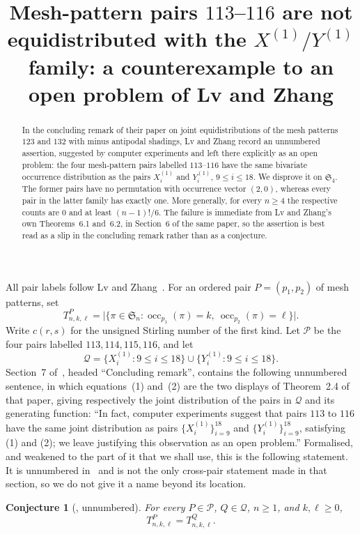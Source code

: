 \documentclass[11pt]{amsart}
\title[Mesh-pattern pairs $113$--$116$ are not equidistributed]
{Mesh-pattern pairs $113$--$116$ are not equidistributed with
the $X^{(1)}/Y^{(1)}$ family: a counterexample to an open problem of
Lv and Zhang}
\date{}
\theoremstyle{plain}
\newtheorem{conjecture}[theorem]{Conjecture}
\theoremstyle{remark}
\newcommand{\Sn}{\mathfrak{S}_n}
\newcommand{\occ}{\operatorname{occ}}
\begin{document}
\begin{abstract}
In the concluding remark of their paper on joint equidistributions of
the mesh patterns $123$ and $132$ with minus antipodal shadings, Lv and
Zhang record an unnumbered assertion, suggested by computer experiments
and left there explicitly as an open problem: the four mesh-pattern
pairs labelled $113$--$116$ have the same bivariate occurrence
distribution as the pairs $X_i^{(1)}$ and $Y_i^{(1)}$, $9\le i\le18$.
We disprove it on $\mathfrak S_4$. The former pairs have no
permutation with occurrence vector $(2,0)$, whereas every pair in
the latter family has exactly one. More generally, for every
$n\ge4$ the respective counts are $0$ and at least $(n-1)!/6$. The
failure is immediate from Lv and Zhang's own Theorems~6.1 and~6.2,
in Section~6 of the same paper, so the assertion is best read as a
slip in the concluding remark rather than as a conjecture.
\end{abstract}

\maketitle

All pair labels follow Lv and Zhang~\cite{LvZhang}. For an ordered
pair $P=(p_1,p_2)$ of mesh patterns, set
\[
T^P_{n,k,\ell}
=
\bigl|\{\pi\in\Sn:
\occ_{p_1}(\pi)=k,\ \occ_{p_2}(\pi)=\ell\}\bigr|.
\]
Write $c(r,s)$ for the unsigned Stirling number of the first kind.
Let $\mathcal P$ be the four pairs labelled $113,114,115,116$, and let
\[
\mathcal Q
=
\{X_i^{(1)}:9\le i\le18\}
\cup
\{Y_i^{(1)}:9\le i\le18\}.
\]
Section~7 of~\cite{LvZhang}, headed ``Concluding remark'', contains the
following unnumbered sentence, in which equations~(1) and~(2) are the
two displays of Theorem~2.4 of that paper, giving respectively the
joint distribution of the pairs in $\mathcal Q$ and its generating
function: ``In fact, computer experiments suggest that pairs $113$ to
$116$ have the same joint distribution as pairs
$\{X^{(1)}_i\}_{i=9}^{18}$ and $\{Y^{(1)}_i\}_{i=9}^{18}$, satisfying
(1) and (2); we leave justifying this observation as an open problem.''
Formalised, and weakened to the part of it that we shall use, this is
the following statement. It is unnumbered in~\cite{LvZhang} and is not
the only cross-pair statement made in that section, so we do not give
it a name beyond its location.

\begin{conjecture}[{\cite[Section~7]{LvZhang}}, unnumbered]
\label{conj:cross}
For every $P\in\mathcal P$, $Q\in\mathcal Q$, $n\ge1$, and
$k,\ell\ge0$,
\[
T^P_{n,k,\ell}=T^Q_{n,k,\ell}.
\]
\end{conjecture}
\end{document}
